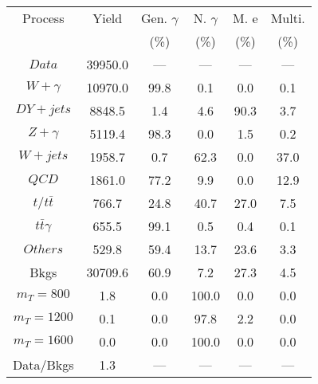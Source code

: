 \begin{figure}
\begin{minipage}[c]{0.32\textwidth}
\tiny{
\begin{tabular}{cccccc}
\hline
Process & Yield & Gen. $\gamma$ & N. $\gamma$ & M. e & Multi. \\
 &  & (\%) & (\%) & (\%) & (\%)  \\
\hline
                                                                      $ Data $ &  39950.0 &  --- &  --- &  --- &  ---\\
$ W+\gamma $ &  10970.0 &  99.8 &  0.1 &  0.0 &  0.1\\
$ DY+jets $ &  8848.5 &  1.4 &  4.6 &  90.3 &  3.7\\
$ Z+\gamma $ &  5119.4 &  98.3 &  0.0 &  1.5 &  0.2\\
$ W+jets $ &  1958.7 &  0.7 &  62.3 &  0.0 &  37.0\\
$ QCD $ &  1861.0 &  77.2 &  9.9 &  0.0 &  12.9\\
$ t/t\bar{t} $ &  766.7 &  24.8 &  40.7 &  27.0 &  7.5\\
$ t\bar{t}\gamma $ &  655.5 &  99.1 &  0.5 &  0.4 &  0.1\\
$ Others $ &  529.8 &  59.4 &  13.7 &  23.6 &  3.3\\
Bkgs &  30709.6 &  60.9 &  7.2 &  27.3 &  4.5\\
$ m_{T} = 800 $ &  1.8 &  0.0 &  100.0 &  0.0 &  0.0\\
$ m_{T} = 1200 $ &  0.1 &  0.0 &  97.8 &  2.2 &  0.0\\
$ m_{T} = 1600 $ &  0.0 &  0.0 &  100.0 &  0.0 &  0.0\\
Data/Bkgs &  1.3 &  --- &  --- &  --- &  ---\\
\hline
\end{tabular}
}
\end{minipage}
\end{figure}

